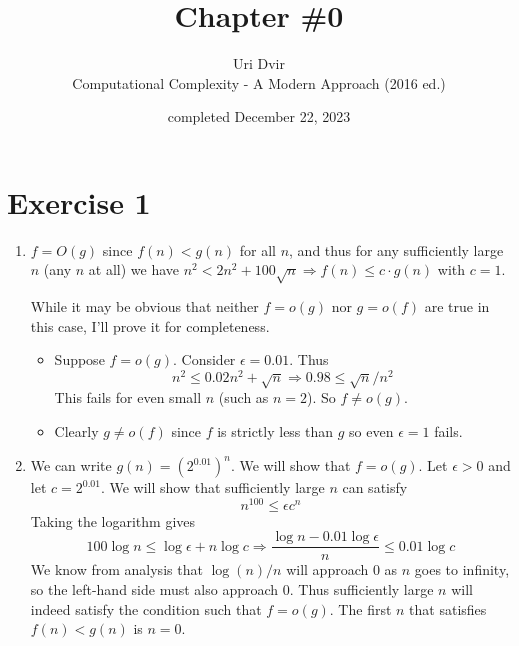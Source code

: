 \documentclass[12pt]{article}
\title{Chapter \#0}
\author{Uri Dvir \\ Computational Complexity - A Modern Approach (2016 ed.)}
\date{completed December 22, 2023}
\begin{document}
\maketitle

\section*{Exercise 1}

\begin{enumerate}
\item{
$f = O(g)$ since $f(n) < g(n)$ for all $n$, and thus for any sufficiently large $n$ (any $n$ at all) we have $n^2 < 2n^2 + 100\sqrt{n} \Rightarrow f(n) \leq c \cdot g(n)$ with $c = 1$.

\noindent
While it may be obvious that neither $f = o(g)$ nor $g = o(f)$ are true in this case, I'll prove it for completeness.
\begin{itemize}
\item{Suppose $f = o(g)$. Consider $\epsilon = 0.01$. Thus
$$
n^2 \leq 0.02n^2 + \sqrt{n} \Rightarrow 0.98 \leq \sqrt{n}/n^2
$$
This fails for even small $n$ (such as $n=2$). So $f \neq o(g)$.}
\item{Clearly $g \neq o(f)$ since $f$ is strictly less than $g$ so even $\epsilon = 1$ fails.}
\end{itemize}
}
\item{
We can write $g(n) = (2^{0.01})^n$. We will show that $f = o(g)$. Let $\epsilon > 0$ and let $c = 2^{0.01}$. We will show that sufficiently large $n$ can satisfy
$$
n^{100} \leq \epsilon c^n
$$
Taking the logarithm gives
$$
100 \log n \leq \log \epsilon + n \log c
\Rightarrow
\frac{\log n - 0.01 \log \epsilon}{n} \leq 0.01\log c
$$
We know from analysis that $\log(n)/n$ will approach 0 as $n$ goes to infinity, so the left-hand side must also approach 0. Thus sufficiently large $n$ will indeed satisfy the condition such that $f = o(g)$. The first $n$ that satisfies $f(n) < g(n)$ is $n=0$.
}
\end{enumerate}
\end{document}
